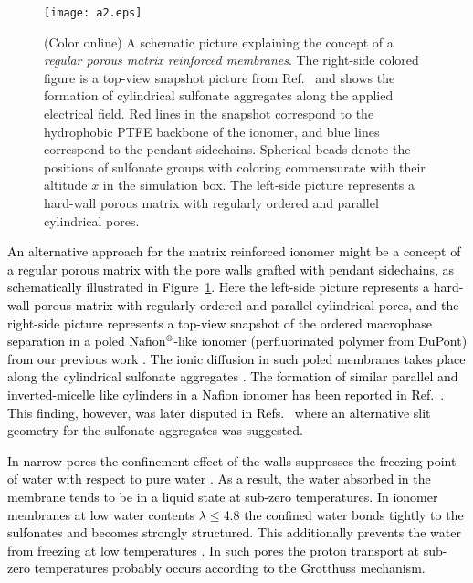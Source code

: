 \documentclass[3p,english,preprint]{elsarticle}
\newcommand{\need}[1]{\textcolor{black}{#1}}
\newcommand{\mage}[1]{\textcolor{black}{#1}}
\begin{document}
\begin{figure} [!ht]
\begin{center}
\texttt{[image: a2.eps]}
\end{center}
\vspace{-0.2cm} 
\caption{ 
(Color online) A schematic picture explaining the concept of 
a {\it regular porous matrix reinforced membranes}. 
The right-side colored figure is a top-view snapshot picture from  
Ref.~\cite{allahyarov-2010-poling-pre} and shows the formation of cylindrical 
sulfonate aggregates along the applied electrical field. 
Red lines in the snapshot  correspond to the hydrophobic PTFE backbone of the ionomer, 
and  blue lines correspond to the pendant sidechains. 
Spherical beads denote the positions of sulfonate groups with coloring 
commensurate with their altitude $x$ in the simulation box. 
The left-side picture represents a hard-wall  
 porous matrix with regularly ordered and parallel cylindrical pores.
\label{fig-1-new}
}
\end{figure}



{\need{ 
 An alternative approach  for the matrix reinforced ionomer might be a 
concept of a regular porous matrix with the pore walls grafted 
with pendant sidechains, 
as  schematically illustrated in Figure~\ref{fig-1-new}.
Here the left-side picture represents a hard-wall  
 porous matrix with regularly ordered and parallel cylindrical pores, and  
the right-side picture represents  a top-view snapshot of 
the ordered macrophase separation in a poled Nafion$\textsuperscript{\textregistered}$-like ionomer 
(perfluorinated polymer from DuPont)
from our previous 
work \cite{allahyarov-2010-poling-pre}.  %
The ionic diffusion in such poled membranes takes place along the 
cylindrical sulfonate aggregates 
\cite{allahyarov-2010-poling-pre,allahyarov-poling-2009,allahyarov-2011-poling-of-dry,allahyarov-2011-poling-diff-archit}. 
The formation of similar parallel and inverted-micelle like cylinders 
in a Nafion ionomer has been 
reported  in Ref.~\cite{shmidt2007}. This finding, however, was later disputed   
in Refs.~\cite{eikerling-2008,kreuer-2013-water-freezing}     %
where an alternative slit geometry for the sulfonate aggregates %
was suggested.
}}


{\need{ 
 In narrow pores the confinement effect of the walls suppresses the freezing point of water   
with respect to pure water 
\cite{cappadonia-1994,cappadonia-1995,rennie-1977-water-freezing,jiao-2009-frozen-water,plazanet-2014-water-freezing-in-nafion,thompson-2006}.  As a result, the  water absorbed in the membrane tends to be in a liquid state at sub-zero temperatures.
In ionomer membranes at low water contents $\lambda$$\le$4.8 the 
confined water   bonds tightly to the sulfonates and becomes strongly structured. This additionally 
prevents the water from freezing at low temperatures
\cite{wan-2014-water-freeze-cold-start-fuel-cell}. In such pores 
the proton transport at sub-zero temperatures probably occurs according to the Grotthuss mechanism. 
}}
\end{document}
